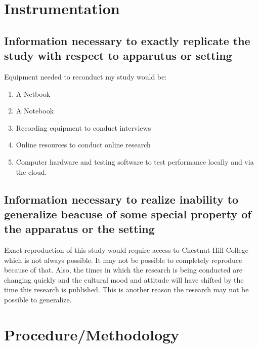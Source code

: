 \documentclass[12pt,oneside,letterpaper,titlepage]{article}
\begin{document}
\section{Instrumentation}


\subsection{Information necessary to exactly replicate the study with respect to apparutus or setting}

Equipment needed to reconduct my study would be:

\begin{enumerate}

\item A Netbook

\item A Notebook

\item Recording equipment to conduct interviews

\item Online resources to conduct online research

\item Computer hardware and testing software to test performance locally and via
  the cloud.

\end{enumerate}

\subsection{Information necessary to realize inability to generalize beacuse of some special property of the apparatus or the setting}

Exact reproduction of this study would require access to Chestnut Hill College
which is not always possible.  It may not be possible to completely reproduce
because of that.  Also, the times in which the research is being conducted are
changing quickly and the cultural mood and attitude will have shifted by the
time this research is published.  This is another reason the research may not be
possible to generalize. 

\section{Procedure/Methodology}

\end{document}
